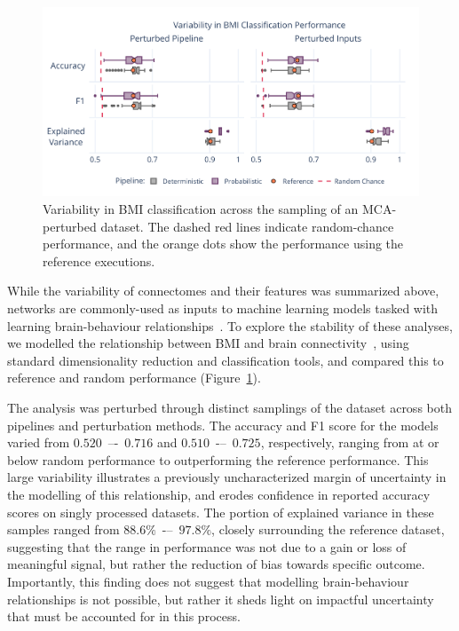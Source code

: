 \documentclass[fleqn,10pt]{SelfArx} %
\begin{document}
\begin{figure}[ht]\centering
\includegraphics[width=\linewidth]{figures/fig3_bmi_classification.pdf}
\caption{Variability in BMI classification across the sampling of an MCA-perturbed dataset. The dashed red lines
indicate random-chance performance, and the orange dots show the performance using the reference executions.}
\label{fig:bmi}
\end{figure}
 
While the variability of connectomes and their features was summarized above, networks are commonly-used as inputs to
machine learning models tasked with learning brain-behaviour relationships~\cite{Dubois2016-yr}. To explore the
stability of these analyses, we modelled the relationship between BMI and brain
connectivity~\cite{Park2015-uj,Gupta2015-ap}, using standard dimensionality reduction and classification tools, and
compared this to reference and random performance (Figure~\ref{fig:bmi}).

The analysis was perturbed through distinct samplings of the dataset across both pipelines and perturbation methods.
The accuracy and F1 score for the models varied from $0.520$~–-~$0.716$ and $0.510$~-–~$0.725$, respectively, ranging
from at or below random performance to outperforming the reference performance. This large variability illustrates a
previously uncharacterized margin of uncertainty in the modelling of this relationship, and erodes confidence in
reported accuracy scores on singly processed datasets. The portion of explained variance in these samples ranged from
$88.6\%$~-–~$97.8\%$, closely surrounding the reference dataset, suggesting that the range in performance was not due
to a gain or loss of meaningful signal, but rather the reduction of bias towards specific outcome. Importantly, this
finding does not suggest that modelling brain-behaviour relationships is not possible, but rather it sheds light on
impactful uncertainty that must be accounted for in this process.
\end{document}
